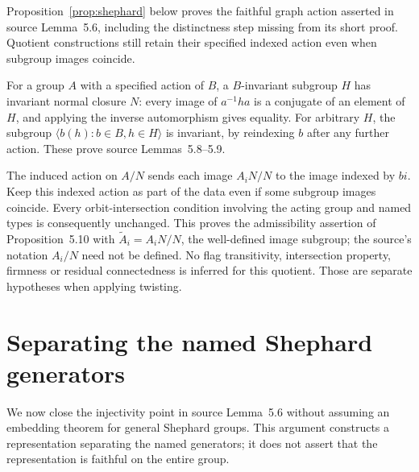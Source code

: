 Proposition~\ref{prop:shephard} below proves the faithful graph action
asserted in source Lemma~5.6, including the distinctness step missing
from its short proof. Quotient constructions still retain their
specified indexed action even when subgroup images coincide.

For a group $A$ with a specified action of $B$, a $B$-invariant
subgroup $H$ has invariant normal closure $N$: every image of
$a^{-1}ha$ is a conjugate of an element of $H$, and applying the
inverse automorphism gives equality. For arbitrary $H$, the subgroup
$\langle b(h):b\in B,h\in H\rangle$ is invariant, by reindexing
$b$ after any further action. These prove source Lemmas~5.8--5.9.

The induced action on $A/N$ sends each image $A_iN/N$ to the image
indexed by $bi$. Keep this indexed action as part of the data even
if some subgroup images coincide. Every orbit-intersection condition
involving the acting group and named types is consequently unchanged.
This proves the admissibility assertion of Proposition~5.10 with
$\widetilde A_i=A_iN/N$, the well-defined image subgroup; the source's
notation $A_i/N$ need not be defined. No flag transitivity, intersection
property, firmness or residual connectedness is inferred for this
quotient. Those are separate hypotheses when applying twisting.

\section{Separating the named Shephard generators}\label{sec:reflection}
We now close the injectivity point in source Lemma~5.6 without assuming
an embedding theorem for general Shephard groups. This argument constructs
a representation separating the named generators; it does not assert that
the representation is faithful on the entire group.

